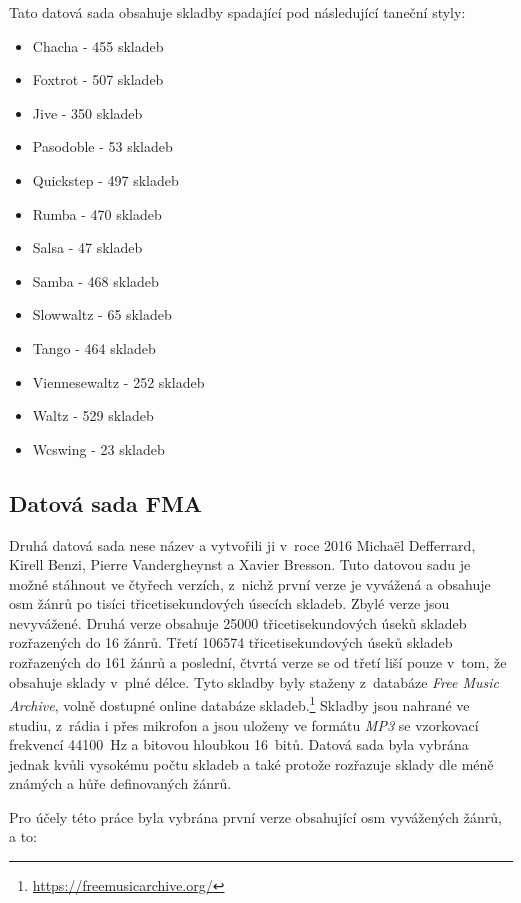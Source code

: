Tato datová sada obsahuje skladby spadající pod následující taneční styly:

\begin{itemize}
    \item Chacha - 455 skladeb
    \item Foxtrot - 507 skladeb
    \item Jive - 350 skladeb
    \item Pasodoble - 53 skladeb
    \item Quickstep - 497 skladeb
    \item Rumba - 470 skladeb
    \item Salsa - 47 skladeb
    \item Samba - 468 skladeb
    \item Slowwaltz - 65 skladeb
    \item Tango - 464 skladeb
    \item Viennesewaltz - 252 skladeb
    \item Waltz - 529 skladeb
    \item Wcswing - 23 skladeb
\end{itemize}

\subsection*{Datová sada FMA}
Druhá datová sada nese název  a vytvořili ji v~roce 2016 Michaël Defferrard, Kirell Benzi, Pierre Vandergheynst a Xavier Bresson. Tuto datovou sadu je možné stáhnout ve čtyřech verzích, z~nichž první verze je vyvážená a obsahuje osm žánrů po tisíci třicetisekundových úsecích skladeb. Zbylé verze jsou nevyvážené. Druhá verze obsahuje 25000 třicetisekundových úseků skladeb rozřazených do 16
žánrů. Třetí 106574 třicetisekundových úseků skladeb rozřazených do 161 žánrů a poslední, čtvrtá verze se od třetí liší pouze v~tom, že obsahuje sklady v~plné délce. Tyto skladby byly staženy z~databáze \textit{Free Music Archive}, volně dostupné online databáze skladeb.\footnote{\url{https://freemusicarchive.org/}} Skladby jsou  nahrané ve studiu, z~rádia i přes mikrofon a jsou uloženy ve formátu \textit{MP3} se vzorkovací frekvencí 44100~Hz a bitovou hloubkou 16~bitů. Datová sada byla vybrána jednak kvůli vysokému počtu skladeb a také protože rozřazuje sklady dle méně známých a hůře definovaných žánrů.\cite{fma_dataset}

Pro účely této práce byla vybrána první verze obsahující osm vyvážených žánrů, a to:

